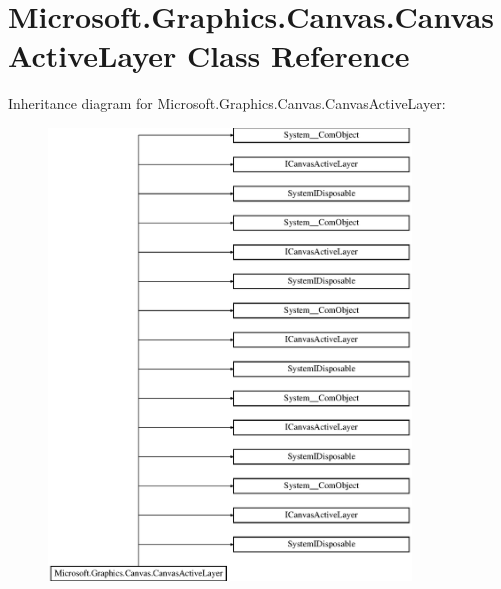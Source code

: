 \hypertarget{class_microsoft_1_1_graphics_1_1_canvas_1_1_canvas_active_layer}{}\section{Microsoft.\+Graphics.\+Canvas.\+Canvas\+Active\+Layer Class Reference}
\label{class_microsoft_1_1_graphics_1_1_canvas_1_1_canvas_active_layer}
Inheritance diagram for Microsoft.\+Graphics.\+Canvas.\+Canvas\+Active\+Layer\+:\begin{figure}[H]
\begin{center}
\leavevmode
\includegraphics[height=12.000000cm]{class_microsoft_1_1_graphics_1_1_canvas_1_1_canvas_active_layer}
\end{center}
\end{figure}
